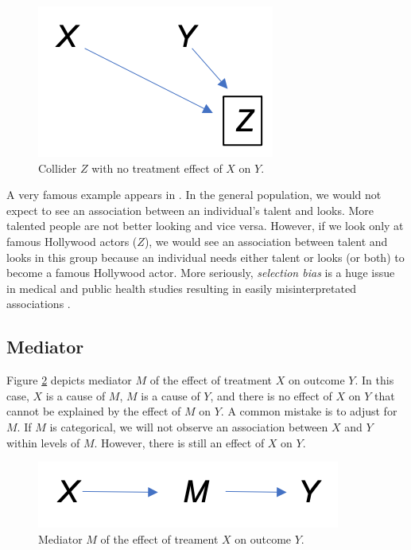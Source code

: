 \documentclass[
]{book}
\begin{document}
\begin{figure}
\centering
\includegraphics{./images/collider.png}
\caption{\label{fig:collider} Collider \(Z\) with no treatment effect of \(X\) on \(Y\).}
\end{figure}

A very famous example appears in \citet{pearl2018book}. In the general population, we would not expect to see an association between an individual's talent and looks. More talented people are not better looking and vice versa. However, if we look only at famous Hollywood actors (\(Z\)), we would see an association between talent and looks in this group because an individual needs either talent or looks (or both) to become a famous Hollywood actor. More seriously, \emph{selection bias} is a huge issue in medical and public health studies resulting in easily misinterpretated associations \citep{hernan2004structural, cole2010illustrating, elwert2014endogenous}.

\hypertarget{mediator}{%
\subsection{Mediator}\label{mediator}}

Figure \ref{fig:mediator} depicts mediator \(M\) of the effect of treatment \(X\) on outcome \(Y\). In this case, \(X\) is a cause of \(M\), \(M\) is a cause of \(Y\), and there is no effect of \(X\) on \(Y\) that cannot be explained by the effect of \(M\) on \(Y\). A common mistake is to adjust for \(M\). If \(M\) is categorical, we will not observe an association between \(X\) and \(Y\) within levels of \(M\). However, there is still an effect of \(X\) on \(Y\).

\begin{figure}
\centering
\includegraphics{./images/mediator.png}
\caption{\label{fig:mediator} Mediator \(M\) of the effect of treament \(X\) on outcome \(Y\).}
\end{figure}
\end{document}
